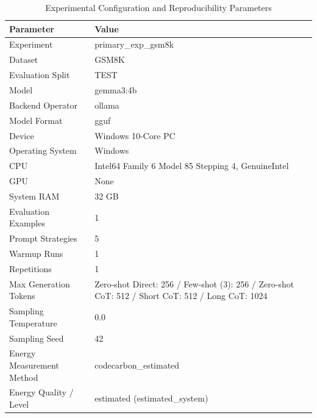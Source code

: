 \begin{table}
\caption{Experimental Configuration and Reproducibility Parameters}
\label{tab:experimental_configuration}
\begin{tabular}{ll}
\toprule
Parameter & Value \\
\midrule
Experiment & primary\_exp\_gsm8k \\
Dataset & GSM8K \\
Evaluation Split & TEST \\
Model & gemma3:4b \\
Backend Operator & ollama \\
Model Format & gguf \\
Device & Windows 10-Core PC \\
Operating System & Windows \\
CPU & Intel64 Family 6 Model 85 Stepping 4, GenuineIntel \\
GPU & None \\
System RAM & 32 GB \\
Evaluation Examples & 1 \\
Prompt Strategies & 5 \\
Warmup Runs & 1 \\
Repetitions & 1 \\
Max Generation Tokens & Zero-shot Direct: 256 / Few-shot (3): 256 / Zero-shot CoT: 512 / Short CoT: 512 / Long CoT: 1024 \\
Sampling Temperature & 0.0 \\
Sampling Seed & 42 \\
Energy Measurement Method & codecarbon\_estimated \\
Energy Quality / Level & estimated (estimated\_system) \\
\bottomrule
\end{tabular}
\end{table}
